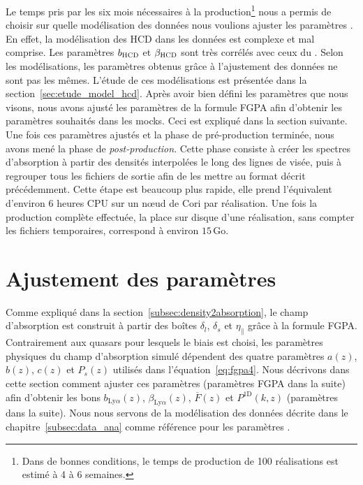   Le temps pris par les six mois nécessaires à la production\footnote{Dans de bonnes conditions, le temps de production de 100 réalisations est estimé à 4 à 6 semaines.} nous a permis de
  choisir sur quelle modélisation des données nous voulions ajuster les paramètres \lya{}.
  En effet, la modélisation des HCD dans les données est complexe et mal comprise. Les paramètres $b_{\textsc{HCD}}$ et $\beta_{\textsc{HCD}}$ sont très corrélés avec ceux du \lya{}. Selon les modélisations, les paramètres \lya{} obtenus grâce à l'ajustement des données ne sont pas les mêmes. L'étude de ces modélisations est présentée dans la section~\ref{sec:etude_model_hcd}.
Après avoir bien défini les paramètres \lya{} que nous visons, nous avons ajusté les paramètres de la formule FGPA afin d'obtenir les paramètres \lya{} souhaités dans les mocks.
Ceci est expliqué dans la section suivante. Une fois ces paramètres ajustés et la phase de pré-production terminée, nous avons mené la phase de \emph{post-production}. Cette phase consiste à créer les spectres d'absorption à partir des densités interpolées le long des lignes de visée, puis à regrouper tous les fichiers de sortie afin de les mettre au format décrit précédemment. Cette étape est beaucoup plus rapide, elle prend l'équivalent d'environ 6 heures CPU sur un nœud de Cori par réalisation. Une fois la production complète effectuée, la place sur disque d'une réalisation, sans compter les fichiers temporaires, correspond à environ $\num{15}\,\mathrm{Go}$.


\section{Ajustement des paramètres}
\label{sec:tuning}
Comme expliqué dans la section~\ref{subsec:density2absorption}, le champ d'absorption \lya{} est construit à partir des boîtes $\delta_l$, $\delta_s$ et $\eta_{\parallel}$ grâce à la formule FGPA.
Contrairement aux quasars pour lesquels le biais est choisi, les paramètres physiques du champ d'absorption \lya{} simulé dépendent des quatre paramètres $a(z)$, $b(z)$, $c(z)$ et $P_{s}(z)$ utilisés dans l'équation~\ref{eq:fgpa4}.
Nous décrivons dans cette section comment ajuster ces paramètres (paramètres FGPA dans la suite) afin d'obtenir les bons $b_{\mathrm{Ly}\alpha}(z)$, $\beta_{\mathrm{Ly}\alpha}(z)$, $\overline F(z)$ et $P^{\mathrm{1D}}(k, z)$ (paramètres \lya{} dans la suite). Nous nous servons de la modélisation des données décrite dans le chapitre~\ref{subsec:data_ana} comme référence pour les paramètres \lya{}.


